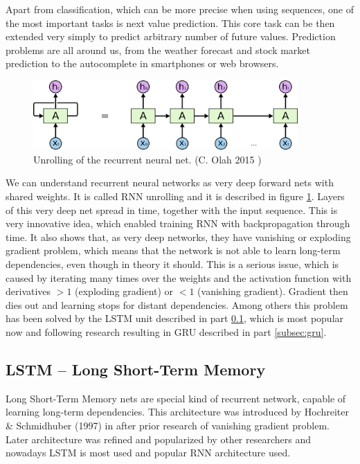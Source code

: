 Apart from classification, which can be more precise when using sequences, one of the most important tasks is next value prediction. This core task can be then extended very simply to predict arbitrary number of future values. Prediction problems are all around us, from the weather forecast and stock market prediction to the autocomplete in smartphones or web browsers.

\begin{figure}[!ht]
	\centering
	\includegraphics[width=0.9\textwidth]{fig/RNN-unrolled.png}
	\caption{Unrolling of the recurrent neural net. (C. Olah 2015 \cite{colah-lstm})
		\label{fig:rnn-unroll}}
\end{figure}

We can understand recurrent neural networks as very deep forward nets with shared weights. It is called RNN unrolling and it is described in figure \ref{fig:rnn-unroll}. Layers of this very deep net spread in time, together with the input sequence. This is very innovative idea, which enabled training RNN with backpropagation through time. It also shows that, as very deep networks, they have vanishing or exploding gradient problem, which means that the network is not able to learn long-term dependencies, even though in theory it should. This is a serious issue,  which is caused by iterating many times over the weights and the activation function with derivatives $>1$ (exploding gradient) or $<1$ (vanishing gradient). Gradient then dies out and learning stops for distant dependencies. Among others this problem has been solved by the LSTM unit described in part \ref{subsec:lstm}, which is most popular now and following research resulting in GRU described in part \ref{subsec:gru}.

		\subsection{LSTM -- Long Short-Term Memory}\label{subsec:lstm}

Long Short-Term Memory nets are special kind of recurrent network, capable of learning long-term dependencies. This architecture was introduced by Hochreiter \& Schmidhuber (1997) in \cite{Hochreiter:1997:LSM:1246443.1246450} after prior research of vanishing gradient problem. Later architecture was refined and popularized by other researchers and nowadays LSTM is most used and popular RNN architecture used.

